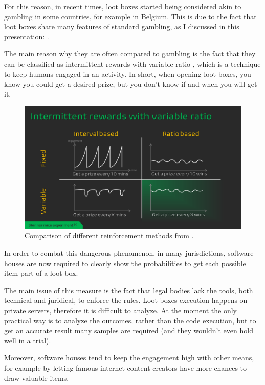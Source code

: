 \documentclass[12pt]{article}
\begin{document}
For this reason, in recent times, loot boxes started being considered akin to gambling in some countries, for example in Belgium. This is due to the fact that loot boxes share many features of standard gambling, as I discussed in this presentation: \cite{lootboxes_computer_ethics}.

The main reason why they are often compared to gambling is the fact that they can be classified as intermittent rewards with variable ratio \cite{intermittent_reinforcement}, which is a technique to keep humans engaged in an activity. 
In short, when opening loot boxes, you know you could get a desired prize, but you don't know if and when you will get it.
\begin{figure}[ht]
    \centering
    \includegraphics[width=\textwidth]{intermittent_rewards} 
    \caption{Comparison of different reinforcement methods from \cite{lootboxes_computer_ethics}.}
    \label{figure:intermittent_rewards}
\end{figure}

In order to combat this dangerous phenomenon, in many jurisdictions, software houses are now required to clearly show the probabilities to get each possible item part of a loot box.

The main issue of this measure is the fact that legal bodies lack the tools, both technical and juridical, to enforce the rules. Loot boxes execution happens on private servers, therefore it is difficult to analyze. At the moment the only practical way is to analyze the outcomes, rather than the code execution, but to get an accurate result many samples are required (and they wouldn't even hold well in a trial).

Moreover, software houses tend to keep the engagement high with other means, for example by letting famous internet content creators have more chances to draw valuable items.
\end{document}
